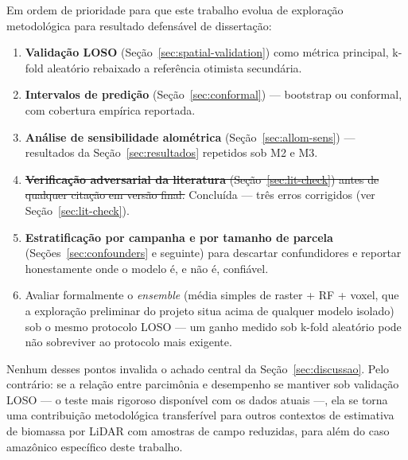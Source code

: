 Em ordem de prioridade para que este trabalho evolua de exploração metodológica
para resultado defensável de dissertação:

\begin{enumerate}
  \item \textbf{Validação LOSO} (Seção~\ref{sec:spatial-validation}) como métrica
    principal, k-fold aleatório rebaixado a referência otimista secundária.
  \item \textbf{Intervalos de predição} (Seção~\ref{sec:conformal}) --- bootstrap
    ou conformal, com cobertura empírica reportada.
  \item \textbf{Análise de sensibilidade alométrica} (Seção~\ref{sec:allom-sens})
    --- resultados da Seção~\ref{sec:resultados} repetidos sob M2 e M3.
  \item \sout{\textbf{Verificação adversarial da literatura}
    (Seção~\ref{sec:lit-check}) antes de qualquer citação em versão final.}
    Concluída --- três erros corrigidos (ver Seção~\ref{sec:lit-check}).
  \item \textbf{Estratificação por campanha e por tamanho de parcela}
    (Seções~\ref{sec:confounders} e seguinte) para descartar confundidores e
    reportar honestamente onde o modelo é, e não é, confiável.
  \item Avaliar formalmente o \textit{ensemble} (média simples de raster + RF +
    voxel, que a exploração preliminar do projeto situa acima de qualquer modelo
    isolado) sob o mesmo protocolo LOSO --- um ganho medido sob k-fold aleatório
    pode não sobreviver ao protocolo mais exigente.
\end{enumerate}

Nenhum desses pontos invalida o achado central da Seção~\ref{sec:discussao}. Pelo
contrário: se a relação entre parcimônia e desempenho se mantiver sob validação
LOSO --- o teste mais rigoroso disponível com os dados atuais ---, ela se torna uma
contribuição metodológica transferível para outros contextos de estimativa de
biomassa por LiDAR com amostras de campo reduzidas, para além do caso amazônico
específico deste trabalho.
